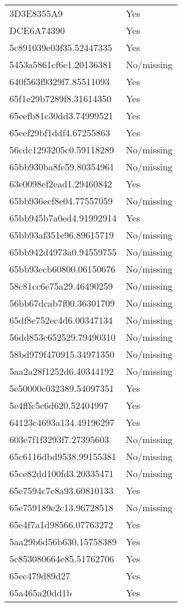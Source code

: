 \begin{tabular}{ll}
3D3E8355A9 & Yes \\
DCE6A74390 & Yes \\
5c891039e03f35.52447335 & Yes \\
5453a5861cf6e1.20136381 & No/missing \\
640f563f9329f7.85511093 & Yes \\
65f1e29b7289f8.31614350 & Yes \\
65eefb81c30dd3.74999521 & Yes \\
65eef29bf1ddf4.67255863 & Yes \\
56cdc1293205c0.59118289 & No/missing \\
65bb930ba8fe59.80354961 & No/missing \\
63e0098ef2ead1.29460842 & Yes \\
65bb936ecf8e04.77557059 & No/missing \\
65bb945b7a0ed4.91992914 & Yes \\
65bb93af351e96.89615719 & No/missing \\
65bb942d4973a0.94559755 & No/missing \\
65bb93ecb60800.06150676 & No/missing \\
58c81cc6e75a29.46490259 & No/missing \\
56bb67dcab7f00.36301709 & No/missing \\
65df8e752ec4d6.00347134 & No/missing \\
56dd853c652529.79490310 & No/missing \\
58bd979f470915.34971350 & No/missing \\
5aa2a28f1252d6.40344192 & No/missing \\
5e50000c032389.54097351 & Yes \\
5e4fffc5c6d620.52404997 & Yes \\
64123c4693a134.49196297 & Yes \\
603e7f1f3293f7.27395603 & No/missing \\
65c6116dbd9538.99155381 & No/missing \\
65ce82dd100fd3.20335471 & No/missing \\
65e7594c7c8a93.60810133 & Yes \\
65e759189e2c13.96728518 & No/missing \\
65e4f7a1d98566.07763272 & Yes \\
5aa29b6d56b630.15758389 & Yes \\
5c853080664e85.51762706 & Yes \\
65ec479d89d27 & Yes \\
65a465a20dd1b & Yes \\

\end{tabular}
